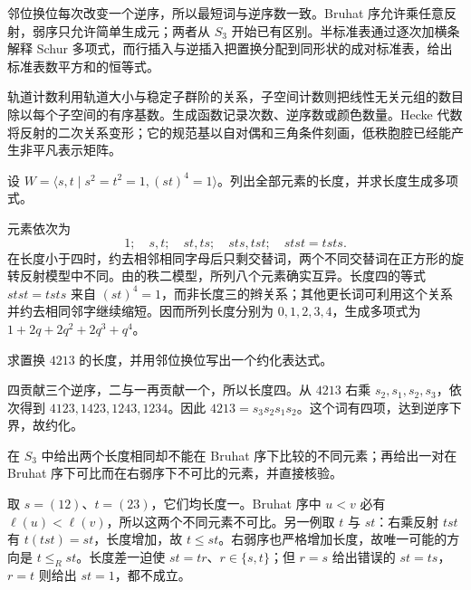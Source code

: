 \begin{chaptersummary}
	邻位换位每次改变一个逆序，所以最短词与逆序数一致。Bruhat 序允许乘任意反射，弱序只允许简单生成元；两者从 \(S_3\) 开始已有区别。半标准表通过逐次加横条解释 Schur 多项式，而行插入与逆插入把置换分配到同形状的成对标准表，给出标准表数平方和的恒等式。

	\ProseParagraphBreak
	轨道计数利用轨道大小与稳定子群阶的关系，子空间计数则把线性无关元组的数目除以每个子空间的有序基数。生成函数记录次数、逆序数或颜色数量。Hecke 代数将反射的二次关系变形；它的规范基以自对偶和三角条件刻画，低秩胞腔已经能产生非平凡表示矩阵。
\end{chaptersummary}

\BookExercises

\begin{exercise}\label{b5:ex:A-dihedral-four}
	设 \(W=\bigl\langle s,t\mid s^2=t^2=1,(st)^4=1\bigr\rangle\)。列出全部元素的长度，并求长度生成多项式。
\end{exercise}
\begin{solution}
	元素依次为
	\[
		1;\quad s,t;\quad st,ts;\quad sts,tst;\quad stst=tsts.
	\]
	在长度小于四时，约去相邻相同字母后只剩交替词，两个不同交替词在正方形的旋转反射模型中不同。由的秩二模型，所列八个元素确实互异。长度四的等式 \(stst=tsts\) 来自 \((st)^4=1\)，而非长度三的辫关系；其他更长词可利用这个关系并约去相同邻字继续缩短。因而所列长度分别为 \(0,1,2,3,4\)，生成多项式为 \(1+2q+2q^2+2q^3+q^4\)。
\end{solution}

\begin{exercise}\label{b5:ex:A-bubble-word}
	求置换 \(4213\) 的长度，并用邻位换位写出一个约化表达式。
\end{exercise}
\begin{solution}
	四贡献三个逆序，二与一再贡献一个，所以长度四。从 \(4213\) 右乘 \(s_2,s_1,s_2,s_3\)，依次得到 \(4123,1423,1243,1234\)。因此 \(4213=s_3s_2s_1s_2\)。这个词有四项，达到逆序下界，故约化。
\end{solution}

\begin{exercise}\label{b5:ex:A-bruhat-not-length}
	在 \(S_3\) 中给出两个长度相同却不能在 Bruhat 序下比较的不同元素；再给出一对在 Bruhat 序下可比而在右弱序下不可比的元素，并直接核验。
\end{exercise}
\begin{solution}
	取 \(s=(12)\)、\(t=(23)\)，它们均长度一。Bruhat 序中 \(u<v\) 必有 \(\ell(u)<\ell(v)\)，所以这两个不同元素不可比。另一例取 \(t\) 与 \(st\)：右乘反射 \(tst\) 有 \(t(tst)=st\)，长度增加，故 \(t\le st\)。右弱序也严格增加长度，故唯一可能的方向是 \(t\le_R st\)。长度差一迫使 \(st=tr\)、\(r\in\{s,t\}\)；但 \(r=s\) 给出错误的 \(st=ts\)，\(r=t\) 则给出 \(st=1\)，都不成立。
\end{solution}

